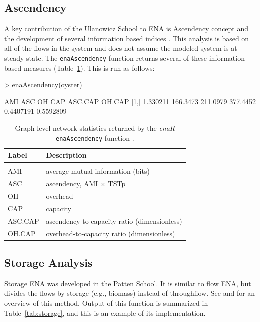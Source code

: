 \documentclass[11pt]{article}
\begin{document}
\subsection{Ascendency}
A key contribution of the Ulanowicz School to ENA is Ascendency
concept and the development of several information based indices
\citep{ulanowicz86, ulanowicz97}.  This analysis is based on all of
the flows in the system and does not assume the modeled system is at
steady-state.  The \texttt{enaAscendency} function returns several of
these information based measures (Table~\ref{tab:asc}).  This is run
as follows:

\begin{Schunk}
\begin{Sinput}
>   enaAscendency(oyster)
\end{Sinput}
\begin{Soutput}
          AMI      ASC       OH      CAP   ASC.CAP    OH.CAP
[1,] 1.330211 166.3473 211.0979 377.4452 0.4407191 0.5592809
\end{Soutput}
\end{Schunk}

\begin{table}[t]
  \caption{Graph-level network statistics returned by the \textit{enaR}
    \texttt{enaAscendency} function \citep[see][for
    interpretations]{ulanowicz86, ulanowicz97}.}\label{tab:asc}
  \center
  \begin{small}
    \begin{tabular}{l l}
      \textbf{Label} & \textbf{Description} \\ \hline \\[-1.5ex]
      AMI & average mutual information (bits) \\
      ASC & ascendency, AMI $\times$ TSTp \\
      OH & overhead \\
      CAP& capacity \\
      ASC.CAP& ascendency-to-capacity ratio (dimensionless)\\
      OH.CAP& overhead-to-capacity ratio (dimensionless)\\
      \hline
    \end{tabular}
  \end{small}
\end{table}

\subsection{Storage Analysis}
Storage ENA was developed in the Patten School.  It is similar to flow
ENA, but divides the flows by storage (e.g., biomass) instead of
throughflow.  See \citet{fath99_review} and \citet{schramski11} for an
overview of this method.  Output of this function is summarized in
Table~\ref{tab:storage}, and this is an example of its implementation.
\end{document}
